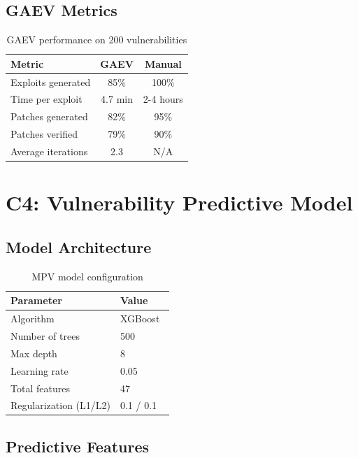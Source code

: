 \documentclass[11pt]{article}
\theoremstyle{definition}
\theoremstyle{plain}
\theoremstyle{remark}
\begin{document}
\subsection{GAEV Metrics}

\begin{table}[H]
\centering
\caption{GAEV performance on 200 vulnerabilities}
\label{tab:gaev_metrics}
\begin{tabular}{lcc}
\toprule
\textbf{Metric} & \textbf{GAEV} & \textbf{Manual} \\
\midrule
Exploits generated & 85\% & 100\% \\
Time per exploit & 4.7 min & 2-4 hours \\
Patches generated & 82\% & 95\% \\
Patches verified & 79\% & 90\% \\
Average iterations & 2.3 & N/A \\
\bottomrule
\end{tabular}
\end{table}

\section{C4: Vulnerability Predictive Model}
\label{sec:mpv}

\subsection{Model Architecture}

\begin{table}[H]
\centering
\caption{MPV model configuration}
\label{tab:mpv_config}
\begin{tabular}{ll}
\toprule
\textbf{Parameter} & \textbf{Value} \\
\midrule
Algorithm & XGBoost~\cite{chen2016xgboost} \\
Number of trees & 500 \\
Max depth & 8 \\
Learning rate & 0.05 \\
Total features & 47 \\
Regularization (L1/L2) & 0.1 / 0.1 \\
\bottomrule
\end{tabular}
\end{table}

\subsection{Predictive Features}
\end{document}
